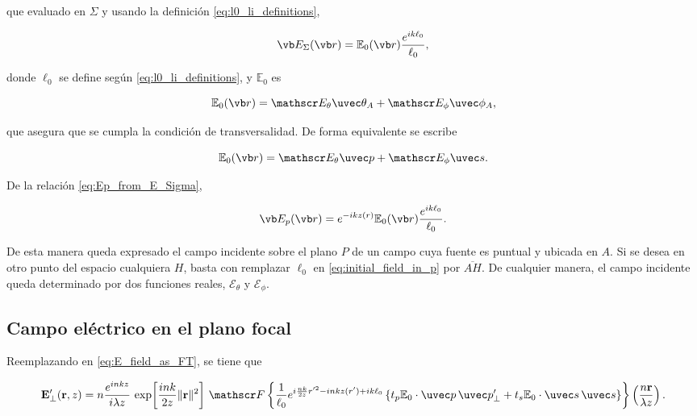 que evaluado en $\Sigma$ y usando la definición \eqref{eq:l0_li_definitions},

\begin{equation}
  \vb E_\Sigma (\vb r)
  =
  \mathbb{E}_0(\vb r)
  \frac{e^{ik\ell_0}}{\ell_0},
  \label{eq:initial_field_sigma}
\end{equation}

donde $\ell_0$ se define según \eqref{eq:l0_li_definitions}, y $\mathbb E_0$ es

\begin{equation}
  \mathbb E_0 (\vb r)
  =
  \mathscr E_\theta \uvec \theta_A
  +
  \mathscr E_\phi \uvec \phi_A,
  \label{eq:mathbb_E_0_definition}
\end{equation}

que asegura que se cumpla la condición de transversalidad. De forma equivalente se escribe

\begin{equation}
  \mathbb E_0 (\vb r)
  =
  \mathscr E_\theta \uvec p
  +
  \mathscr E_\phi \uvec s.
  \label{eq:mathbb_E_0_definition_ps}
\end{equation}

De la relación \eqref{eq:Ep_from_E_Sigma},

\begin{equation}
  \vb E_p (\vb r)
  =
  e^{-ikz(r)}
  \mathbb{E}_0(\vb r)
  \frac{e^{ik\ell_0}}{\ell_0}.
  \label{eq:initial_field_in_p}
\end{equation}

De esta manera queda expresado el campo incidente sobre el plano $P$ de un campo cuya fuente es puntual y ubicada en $A$. Si se desea en otro punto del espacio cualquiera $H$, basta con remplazar $\ell_0$ en \eqref{eq:initial_field_in_p} por $\overline{AH}$. De cualquier manera, el campo incidente queda determinado por dos funciones reales, $\mathscr E_\theta$ y $\mathscr E_\phi$.

\subsection{Campo eléctrico en el plano focal}

Reemplazando en \eqref{eq:E_field_as_FT}, se tiene que

\begin{equation}
\mathbf{E}'_\perp(\mathbf r,z)
=
n\frac{e^{inkz}}{i\lambda z}\,
\exp\!\left[
\frac{ink}{2z}\|\mathbf r\|^2
\right]
\,
\mathscr F
\left\{
\frac{1}{\ell_0}
e^{i\frac{nk}{2 z}r'^2 - inkz(r') + ik\ell_0}
\left\{
t_p \mathbb E_0 \cdot \uvec p \, \uvec p'_\perp
+
t_s \mathbb E_0 \cdot \uvec s \, \uvec s
\right\}
\right\}
\left(
\frac{n\mathbf r}{\lambda z}
\right).
\end{equation}

